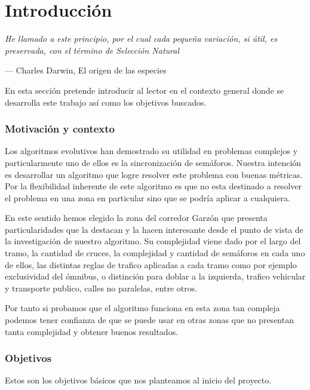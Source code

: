 \chapter{Introducción}
\epigraph{ \textit{He llamado a este principio, por el cual cada pequeña variación, si útil, es preservada, con el término de Selección Natural}}{--- Charles Darwin, El origen de las especies}

En esta sección pretende introducir al lector en el contexto general donde se desarrolla este trabajo así como los objetivos buscados.

\subsection{Motivación y contexto}

Los algoritmos evolutivos han demostrado su utilidad en problemas complejos y particularmente uno de ellos es la sincronización de semáforos. Nuestra intención es desarrollar un algoritmo que logre resolver este problema con buenas métricas.
Por la flexibilidad inherente de este algoritmo es que no esta destinado a resolver el problema en una zona en particular sino que se podría aplicar a cualquiera.

En este sentido hemos elegido la zona del corredor Garzón que presenta particularidades que la destacan y la hacen interesante desde el punto de vista de la investigación de nuestro algoritmo. Su complejidad viene dado por el largo del tramo, la cantidad de cruces, la complejidad y cantidad de semáforos en cada uno de ellos, las distintas reglas de trafico aplicadas a cada tramo como por ejemplo exclusividad del ómnibus, o distinción para doblar a la izquierda, trafico vehicular y transporte publico, calles no paralelas, entre otros.

Por tanto si probamos que el algoritmo funciona en esta zona tan compleja podemos tener confianza de que se puede usar en otras zonas que no presentan tanta complejidad y obtener buenos resultados.



\newpage

\subsection{Objetivos}

Estos son los objetivos básicos que nos planteamos al inicio del  proyecto.

